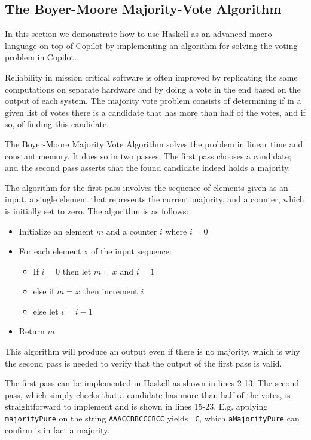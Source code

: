 \subsection{The Boyer-Moore Majority-Vote Algorithm}
\label{subsec:boyer_moore}

In this section we demonstrate how to use Haskell as an advanced macro language
on top of Copilot by implementing an algorithm for solving the voting problem
in Copilot.

Reliability in mission critical software is often improved by replicating
the same computations on separate hardware and by doing a vote in the end
based on the output of each system. The majority vote problem consists of
determining if in a given list of votes there is a candidate that has more
than half of the votes, and if so, of finding this candidate.

The Boyer-Moore Majority Vote Algorithm \cite{MooreBoyer82,Hesselink2005} solves
the problem in linear time and constant memory. It does so in two passes: The
first pass chooses a candidate; and the second pass asserts that the
found candidate indeed holds a majority.

The algorithm for the first pass involves the sequence of elements given as an input,
a single element that represents the current majority, and a counter,
which is initially set to zero. The algorithm is as follows:
\begin{itemize}
\item Initialize an element $m$ and a counter $i$ where $i=0$
\item For each element x of the input sequence: 
	\begin{itemize} 
	\item If $i=0$ then let $m=x$ and $i=1$
	\item else if $m=x$ then increment $i$
	\item else let $i = i-1$
	\end{itemize}
\item Return $m$
\end{itemize}

This algorithm will produce an output even if there is no majority, which is why 
the second pass is needed to verify that the output of the first pass is valid. 




The first pass can be implemented
in Haskell as shown in lines 2-13. The second pass, which
simply checks that a candidate has more than half of the votes, is
straightforward to implement and is shown in lines 15-23.
E.g. applying {\tt majorityPure} on the string {\tt AAACCBBCCCBCC} yields {\tt
  C}, which {\tt aMajorityPure} can confirm is in fact a majority.

